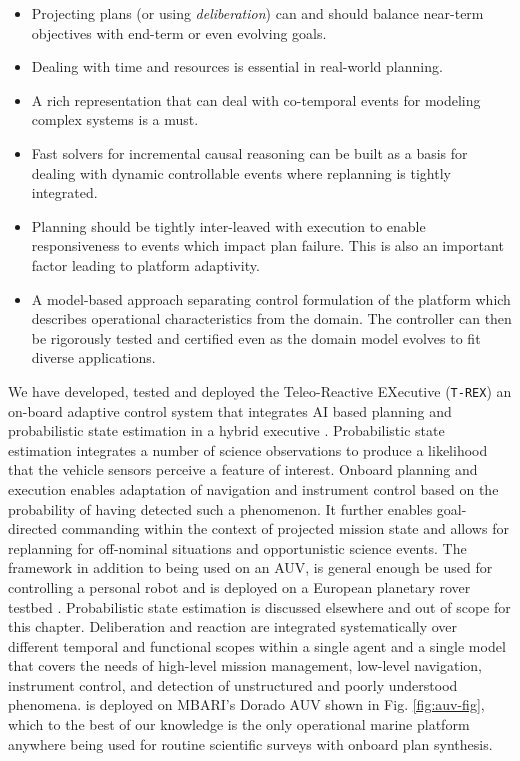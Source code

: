 \begin{itemize}

\item Projecting plans (or using \emph{deliberation}) can and should
  balance near-term objectives with end-term or even evolving goals.

\item Dealing with time and resources is essential in real-world
  planning.

\item A rich representation that can deal with co-temporal events for
  modeling complex systems is a must.

\item Fast solvers for incremental causal reasoning can be built as a
  basis for dealing with dynamic controllable events where replanning
  is tightly integrated.

\item Planning should be tightly inter-leaved with execution to enable
  responsiveness to events which impact plan failure. This is also an
  important factor leading to platform adaptivity.

\item A model-based approach separating control formulation of the
  platform which describes operational characteristics from the
  domain. The controller can then be rigorously tested and certified
  even as the domain model evolves to fit diverse applications.

\end{itemize}

We have developed, tested and deployed the Teleo-Reactive EXecutive
(\texttt{T-REX}) an on-board adaptive control system that integrates
AI based planning and probabilistic state estimation in a hybrid
executive \cite{mcgann08a,mcgann08b,Py10}.  Probabilistic state
estimation integrates a number of science observations to produce a
likelihood that the vehicle sensors perceive a feature of
interest. Onboard planning and execution enables adaptation of
navigation and instrument control based on the probability of having
detected such a phenomenon. It further enables goal-directed
commanding within the context of projected mission state and allows
for replanning for off-nominal situations and opportunistic science
events. The framework in addition to being used on an AUV, is general
enough be used for controlling a personal robot \cite{mcgann2009} and
is deployed on a European planetary rover testbed
\cite{goac11}. Probabilistic state estimation is discussed elsewhere
\cite{mcgann08d} and out of scope for this chapter. Deliberation and
reaction are integrated systematically over different temporal and
functional scopes within a single agent and a single model that covers
the needs of high-level mission management, low-level navigation,
instrument control, and detection of unstructured and poorly
understood phenomena. \rx is deployed on MBARI's Dorado AUV shown in
Fig. \ref{fig:auv-fig}, which to the best of our knowledge is the only
operational marine platform anywhere being used for routine scientific
surveys with onboard plan synthesis.


